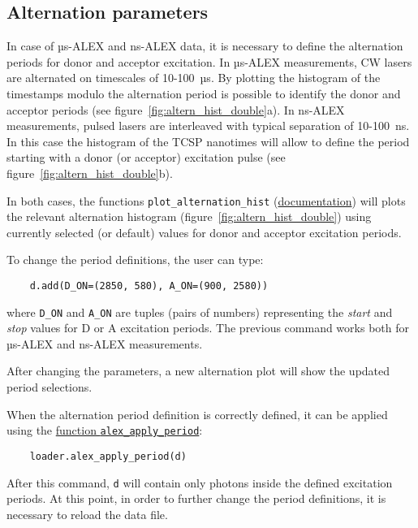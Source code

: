 \subsection{Alternation parameters}
\label{sec:alternation}

In case of µs-ALEX and ns-ALEX data, it is necessary to define the
alternation periods for donor and acceptor excitation. 
In µs-ALEX measurements, CW lasers are alternated on timescales of 10-100~µs.
By plotting the histogram of the timestamps modulo the alternation period
is possible to identify the donor and acceptor periods (see figure~\ref{fig:altern_hist_double}a).
In ns-ALEX measurements, pulsed lasers are interleaved with typical separation of 10-100~ns.
In this case the histogram of the TCSP nanotimes will allow to define the period
starting with a donor (or acceptor) excitation pulse (see figure~\ref{fig:altern_hist_double}b).

In both cases, the functions
\verb|plot_alternation_hist| (\href{http://fretbursts.readthedocs.org/en/latest/plots.html#fretbursts.burst\_plot.plot\_alternation\_hist}{documentation})
will plots the relevant alternation histogram (figure~\ref{fig:altern_hist_double}) 
using currently selected (or default) values for donor and acceptor excitation periods.

To change the period definitions, the user can type:

\begin{verbatim}
    d.add(D_ON=(2850, 580), A_ON=(900, 2580))
\end{verbatim}

where \verb|D_ON| and \verb|A_ON| are tuples (pairs of numbers) representing
the \textit{start} and \textit{stop} values for D or A excitation periods.
The previous command works both for µs-ALEX and ns-ALEX measurements.

After changing the parameters, a new alternation plot will show the updated 
period selections.

When the alternation period definition is correctly defined, it can
be applied using the
\href{http://fretbursts.readthedocs.org/en/latest/loader.html#fretbursts.loader.alex_apply_period}{function \texttt{alex\_apply\_period}}:

\begin{verbatim}
    loader.alex_apply_period(d)
\end{verbatim}

After this command, \verb|d| will contain only photons inside the defined excitation periods. 
At this point, in order to further change the period definitions,
it is necessary to reload the data file.
